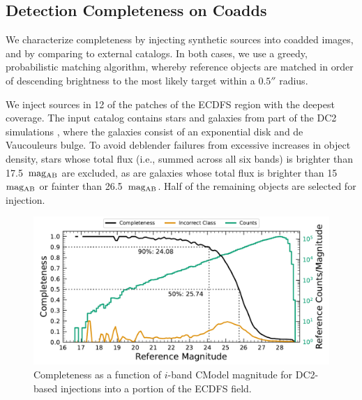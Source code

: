\subsection{Detection Completeness on Coadds}
\label{ssec:detection_completeness}
We characterize completeness by injecting synthetic sources into coadded images, and by comparing to external catalogs.
In both cases, we use a greedy, probabilistic matching \gls{algorithm}, whereby reference objects are matched in order of descending brightness to the most likely target within a $0.5''$ radius.

We inject sources in 12 of the patches of the \gls{ECDFS} region with the deepest coverage.
The input catalog contains stars and galaxies from part of the \gls{DC2} simulations \citep{2021ApJS..253...31L}, where the galaxies consist of an exponential disk and de Vaucouleurs \citep{1948AnAp...11..247D,1953MNRAS.113..134D} bulge.
To avoid deblender failures from excessive increases in object density, stars whose total \gls{flux} (i.e., summed across all six bands) is brighter than 17.5~${\rm mag_{\rm AB}}$ are excluded, as are galaxies whose total \gls{flux} is brighter than 15~${\rm mag_{AB}}$ or fainter than 26.5~${\rm mag_{AB}}$. Half of the remaining objects are selected for injection.

\begin{figure}[htb]
\centering
\includegraphics[width=0.98\linewidth]{figures/injected_lsst_cells_v1_5063_i_completeness_any.pdf}
\caption{Completeness as a function of $i$-band CModel magnitude for \gls{DC2}-based injections into a portion of the \gls{ECDFS} field.}
\label{fig:injected_lsst_cells_v1_5063_i_completeness_any}
\vspace{0.1cm}
\end{figure}

